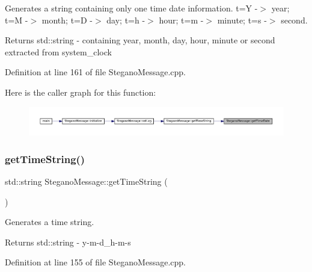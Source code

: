 Generates a string containing only one time date information. t=Y -\/$>$ year; t=M -\/$>$ month; t=D -\/$>$ day; t=h -\/$>$ hour; t=m -\/$>$ minute; t=s -\/$>$ second. 

\begin{DoxyReturn}{Returns}
std\+::string -\/ containing year, month, day, hour, minute or second extracted from system\+\_\+clock 
\end{DoxyReturn}


Definition at line 161 of file Stegano\+Message.\+cpp.

Here is the caller graph for this function\+:\nopagebreak
\begin{figure}[H]
\begin{center}
\leavevmode
\includegraphics[width=350pt]{classSteganoMessage_a9aaa5e476220c95e1a68b4d722de43b1_icgraph}
\end{center}
\end{figure}
\mbox{\label{classSteganoMessage_a9771a4abc2d7a5a2a8cfb1684f7f313f}} 
\subsubsection{\texorpdfstring{getTimeString()}{getTimeString()}}
{\footnotesize\ttfamily std\+::string Stegano\+Message\+::get\+Time\+String (\begin{DoxyParamCaption}{ }\end{DoxyParamCaption})\hspace{0.3cm}{\ttfamily [static]}}



Generates a time string. 

\begin{DoxyReturn}{Returns}
std\+::string -\/ y-\/m-\/d\+\_\+h-\/m-\/s 
\end{DoxyReturn}


Definition at line 155 of file Stegano\+Message.\+cpp.


